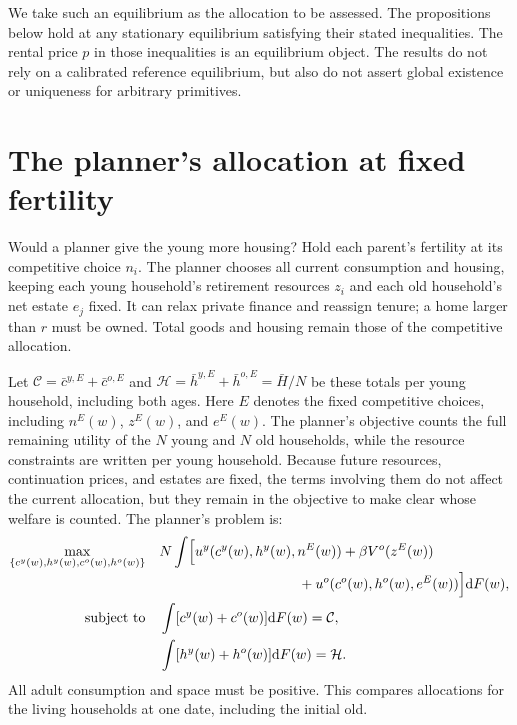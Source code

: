 \documentclass[11pt]{article}
\newcommand{\dd}{\mathrm d}
\begin{document}
We take such an equilibrium as the allocation to be assessed. The propositions
below hold at any stationary equilibrium satisfying their stated inequalities.
The rental price $p$ in those inequalities is an equilibrium object. The
results do not rely on a calibrated reference equilibrium, but also do not
assert global existence or uniqueness for arbitrary primitives.

\section{The planner's allocation at fixed fertility}

Would a planner give the young more housing? Hold each parent's fertility at
its competitive choice $n_i$. The planner chooses all current consumption and
housing, keeping each young household's retirement resources $z_i$ and each
old household's net estate $e_j$ fixed. It can relax private finance and
reassign tenure; a home larger than $r$ must be owned. Total goods and housing
remain those of the competitive allocation.

Let $\mathcal C=\bar c^{y,E}+\bar c^{o,E}$ and
$\mathcal H=\bar h^{y,E}+\bar h^{o,E}=\bar H/N$ be these totals per young
household, including both ages. Here $E$ denotes the fixed competitive choices,
including $n^E(w)$, $z^E(w)$, and $e^E(w)$. The planner's objective counts the
full remaining utility of the $N$ young and $N$ old households, while the resource
constraints are written per young household. Because future resources,
continuation prices, and estates are fixed, the terms involving them do not
affect the current allocation, but they remain in the objective to make clear
whose welfare is counted. The planner's problem is:
\begin{equation}
\begin{split}
\max_{\{c^y(w),h^y(w),c^o(w),h^o(w)\}}\quad
 &N\int\Bigl[u^y(c^y(w),h^y(w),n^E(w))
       +\beta V^o(z^E(w))\\[-2pt]
 &\hspace{35mm}{}+u^o(c^o(w),h^o(w),e^E(w))\Bigr]\dd F(w),\\
\text{subject to}\quad
 &\int[c^y(w)+c^o(w)]\dd F(w)=\mathcal C,\\
 &\int[h^y(w)+h^o(w)]\dd F(w)=\mathcal H.
\end{split}
\label{eq:dated_planner}
\end{equation}
All adult consumption and space must be positive. This compares allocations
for the living households at one date, including the initial old.
\end{document}
